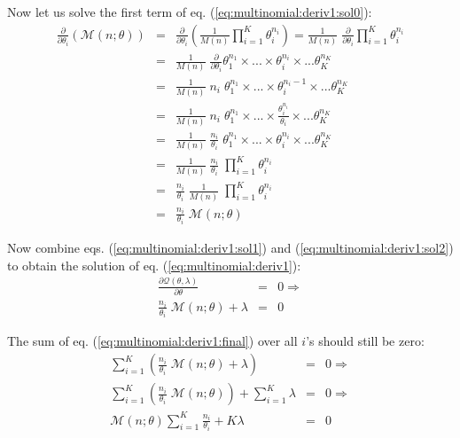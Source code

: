 Now let us solve the first term of eq. (\ref{eq:multinomial:deriv1:sol0}):
\begin{eqnarray}
\frac{\partial}{\partial \theta_i}
   \left( \mathcal{M}(n;\theta) \right) & = &
\frac{\partial}{\partial \theta_i}
   \left( \frac{1}{M(n)} \prod_{i=1}^K \theta_i ^ {n_i} \right) =
\frac{1}{M(n)} \; \frac{\partial}{\partial \theta_i}
   \prod_{i=1}^K \theta_i ^ {n_i}
\\
& = & 
\frac{1}{M(n)} \; \frac{\partial}{\partial \theta_i}
  \theta_1^{n_1} \times ... \times \theta_i^{n_i}
  \times ... \theta_K^{n_K}
\\
& = & 
\frac{1}{M(n)} \;
  n_i \;
  \theta_1^{n_1} \times ... \times
  \theta_i^{n_i - 1}
  \times ... \theta_K^{n_K}
\\
& = & 
\frac{1}{M(n)} \;
  n_i \;
  \theta_1^{n_1} \times ... \times 
  \frac{\theta_i^{n_i}}{\theta_i}
  \times ... \theta_K^{n_K} 
\\
& = & 
\frac{1}{M(n)} \;
  \frac{n_i}{\theta_i} \;
  \theta_1^{n_1} \times ... \times 
  \theta_i^{n_i}
  \times ... \theta_K^{n_K} 
\\
& = & 
\frac{1}{M(n)} \;
  \frac{n_i}{\theta_i} \; \prod_{i=1}^K \theta_i ^ {n_i}
\\
& = & 
\frac{n_i}{\theta_i} \;
\frac{1}{M(n)} \; \prod_{i=1}^K \theta_i ^ {n_i}
\\
& = & 
\frac{n_i}{\theta_i} \; \mathcal{M}(n ; \theta)
\label{eq:multinomial:deriv1:sol1}
\end{eqnarray}

Now combine eqs. (\ref{eq:multinomial:deriv1:sol1}) and (\ref{eq:multinomial:deriv1:sol2}) to obtain the solution of eq. (\ref{eq:multinomial:deriv1}):
\begin{eqnarray}
\frac{\partial \mathcal{Q}(\theta, \lambda)}{\partial \theta} & = & 0 
\Rightarrow \\
\frac{n_i}{\theta_i} \; \mathcal{M}(n ; \theta) + \lambda & = & 0
\label{eq:multinomial:deriv1:final}
\end{eqnarray}

The sum of eq. (\ref{eq:multinomial:deriv1:final}) over all $i$'s should still be zero:
\begin{eqnarray}
\sum_{i=1}^K \left( \frac{n_i}{\theta_i} \; \mathcal{M}(n ; \theta) + \lambda \right) & = & 0 
\Rightarrow \\
\sum_{i=1}^K  \left( \frac{n_i}{\theta_i} \; \mathcal{M}(n ; \theta) \right)
+
 \sum_{i=1}^K \lambda & = & 0 
\Rightarrow \\
\mathcal{M}(n ; \theta) \sum_{i=1}^K \frac{n_i}{\theta_i}
+ K \lambda & = & 0 
\label{eq:multinomial:deriv1:sum}
\end{eqnarray}

